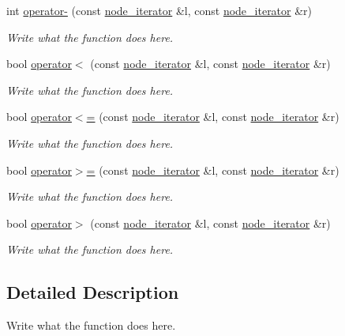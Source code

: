 \begin{DoxyCompactItemize}
int \hyperlink{classnode__iterator_aca04993c54f56e95d1be14feaeb7766f}{operator-\/} (const \hyperlink{classnode__iterator}{node\+\_\+iterator} \&l, const \hyperlink{classnode__iterator}{node\+\_\+iterator} \&r)
\begin{DoxyCompactList}\small\item\em Write what the function does here. \end{DoxyCompactList}\item 
bool \hyperlink{classnode__iterator_a545664b456b4e3c268ad91fec9e530b5}{operator$<$} (const \hyperlink{classnode__iterator}{node\+\_\+iterator} \&l, const \hyperlink{classnode__iterator}{node\+\_\+iterator} \&r)
\begin{DoxyCompactList}\small\item\em Write what the function does here. \end{DoxyCompactList}\item 
bool \hyperlink{classnode__iterator_a538fbcfacacb3cf1ac7d3041b3342dc3}{operator$<$=} (const \hyperlink{classnode__iterator}{node\+\_\+iterator} \&l, const \hyperlink{classnode__iterator}{node\+\_\+iterator} \&r)
\begin{DoxyCompactList}\small\item\em Write what the function does here. \end{DoxyCompactList}\item 
bool \hyperlink{classnode__iterator_a5d35f6f6fdf2dfeb5a7cdac7649b216f}{operator$>$=} (const \hyperlink{classnode__iterator}{node\+\_\+iterator} \&l, const \hyperlink{classnode__iterator}{node\+\_\+iterator} \&r)
\begin{DoxyCompactList}\small\item\em Write what the function does here. \end{DoxyCompactList}\item 
bool \hyperlink{classnode__iterator_a74e84d83365092b345464ea91fc1b46c}{operator$>$} (const \hyperlink{classnode__iterator}{node\+\_\+iterator} \&l, const \hyperlink{classnode__iterator}{node\+\_\+iterator} \&r)
\begin{DoxyCompactList}\small\item\em Write what the function does here. \end{DoxyCompactList}\end{DoxyCompactItemize}


\subsection{Detailed Description}
Write what the function does here. 


